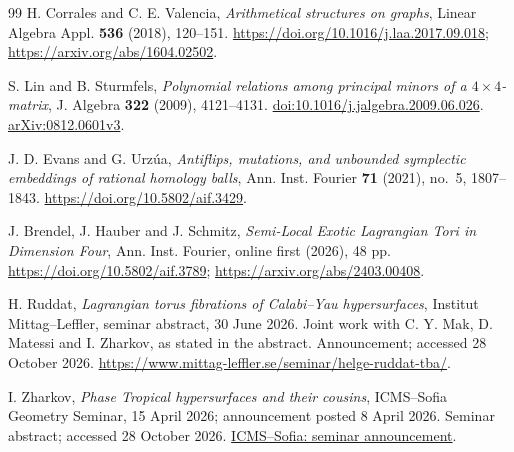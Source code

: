 \begin{thebibliography}{99}
H. Corrales and C. E. Valencia,
\emph{Arithmetical structures on graphs},
Linear Algebra Appl. \textbf{536} (2018), 120--151.
\url{https://doi.org/10.1016/j.laa.2017.09.018};
\url{https://arxiv.org/abs/1604.02502}.



S. Lin and B. Sturmfels,
\emph{Polynomial relations among principal minors of a $4\times4$-matrix},
J. Algebra \textbf{322} (2009), 4121--4131.
\href{https://doi.org/10.1016/j.jalgebra.2009.06.026}{doi:10.1016/j.jalgebra.2009.06.026}.
\href{https://arxiv.org/abs/0812.0601}{arXiv:0812.0601v3}.


J. D. Evans and G. Urz\'ua,
\emph{Antiflips, mutations, and unbounded symplectic embeddings of rational homology balls},
Ann. Inst. Fourier \textbf{71} (2021), no.~5, 1807--1843.
\url{https://doi.org/10.5802/aif.3429}.

J. Brendel, J. Hauber and J. Schmitz,
\emph{Semi-Local Exotic Lagrangian Tori in Dimension Four},
Ann. Inst. Fourier, online first (2026), 48 pp.
\url{https://doi.org/10.5802/aif.3789};
\url{https://arxiv.org/abs/2403.00408}.

H. Ruddat,
\emph{Lagrangian torus fibrations of Calabi--Yau hypersurfaces},
Institut Mittag--Leffler, seminar abstract, 30 June 2026.
Joint work with C. Y. Mak, D. Matessi and I. Zharkov, as stated in the abstract.
Announcement; accessed 28 October 2026.
\url{https://www.mittag-leffler.se/seminar/helge-ruddat-tba/}.

I. Zharkov,
\emph{Phase Tropical hypersurfaces and their cousins},
ICMS--Sofia Geometry Seminar, 15 April 2026; announcement posted 8 April 2026.
Seminar abstract; accessed 28 October 2026.
\href{https://icms.bg/phase-tropical-hypersurfaces-and-their-cousins-geometry-seminar-talk-by-ilia-zharkov/}{ICMS--Sofia: seminar announcement}.

\end{thebibliography}
